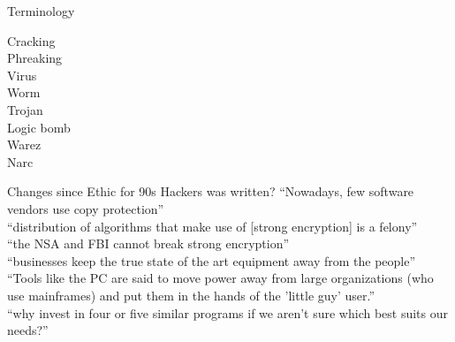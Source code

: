 \documentclass{beamer}
\begin{document}
\begin{frame}{Terminology}
\begin{description}
\item[Cracking] 
\item[Phreaking] 
\item[Virus] 
\item[Worm] 
\item[Trojan] 
\item[Logic bomb] 
\item[Warez] 
\item[Narc] 
\end{description}
\end{frame}

\begin{frame}{Changes since Ethic for 90s Hackers was written?}
``Nowadays, few software vendors use copy protection''\\[1em]
\pause
``distribution of algorithms that make use of [strong encryption] is a felony''\\[1em]
\pause
``the NSA and FBI cannot break strong encryption''\\[1em]
\pause
``businesses keep the true state of the art equipment away from the people''\\[1em]
\pause
``Tools like the PC are said to move power away from large organizations (who use mainframes) and put them in the hands of the 'little guy' user.''\\[1em]
\pause
``why invest in four or five similar programs if we aren't sure which best suits our needs?''
\end{frame}
\end{document}
